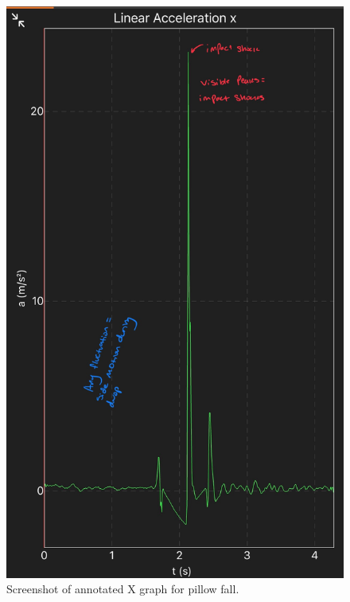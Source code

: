 \documentclass[idxtotoc,hyperref,openany]{labbook} %
\begin{document}
\begin{figure}[H] %
\begin{center}
\includegraphics[width=.80\linewidth]{images/Lab.04/Lab04X.jpg}
\end{center}
\caption{Screenshot of annotated X graph for pillow fall.}
\label{fig:Lab04-AnnotatedXGraph}
\end{figure}
\end{document}
